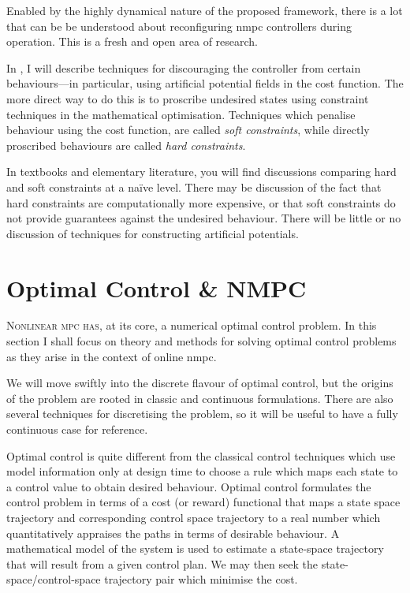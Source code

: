 Enabled by the highly dynamical nature of the proposed framework, there is a lot
that can be be understood about reconfiguring \ac{nmpc} controllers during
operation. This is a fresh and open area of research.

In , I will describe techniques for discouraging the controller
from certain behaviours—in particular, using artificial potential fields in the
cost function. The more direct way to do this is to proscribe undesired states
using constraint techniques in the mathematical optimisation. Techniques which penalise
behaviour using the cost function, are called \emph{soft constraints}, while
directly proscribed behaviours are called \emph{hard constraints}.

In textbooks and elementary literature, you will find discussions comparing hard
and soft constraints at a naïve level. There may be discussion of the fact that
hard constraints are computationally more expensive, or that soft constraints do
not provide guarantees against the undesired behaviour. There will be little or
no discussion of techniques for constructing artificial potentials.



\section{Optimal Control \& NMPC}%
\label{sec:NMPC}


\textsc{Nonlinear \acs{mpc} has}, at its core, a numerical optimal control
problem. In this section I shall focus on theory and methods for solving optimal
control problems as they arise in the context of online \ac{nmpc}.

We will move swiftly into the discrete flavour of optimal control, but the
origins of the problem are rooted in classic and continuous formulations. There
are also several techniques for discretising the problem, so it will be useful
to have a fully continuous case for reference.

Optimal control is quite different from the classical control techniques which
use model information only at design time to choose a rule which maps each state
to a control value to obtain desired behaviour. Optimal control formulates the
control problem in terms of a cost (or reward) functional that maps a state
space trajectory and corresponding control space trajectory to a real number
which quantitatively appraises the paths in terms of desirable behaviour. A
mathematical model of the system is used to estimate a state-space trajectory
that will result from a given control plan. We may then seek the
state-space/control-space trajectory pair which minimise the cost.


